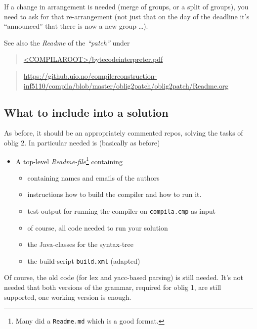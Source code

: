 \documentclass[11pt,freeform]{handout}[2014/08/13]
\begin{document}
If a change in arrangement is needed (merge of groups, or a split of
groups), you need to ask for that re-arrangement (not just that on the day
of the deadline it's ``announced'' that there is now a new group \ldots).



See also the \emph{Readme} of the \emph{``patch''} under

\begin{quote}
  \url{<COMPILAROOT>/bytecodeinterpreter.pdf}
\end{quote}

\begin{quote}
  \url{https://github.uio.no/compilerconstruction-inf5110/compila/blob/master/oblig2patch/oblig2patch/Readme.org}
\end{quote}


\subsection{What to include into a solution}
\label{sec:what-include-into}

As before, it should be an appropriately commented repos, solving the tasks
of oblig 2. In particular needed is (basically as before)


\begin{itemize}
\item A top-level \emph{Readme-file}\footnote{Many did a \texttt{Readme.md}
    which is a good format.} containing
  \begin{itemize}
  \item  containing names and emails of the authors
  \item instructions how to build the compiler and how to run it.
  \item test-output for running the compiler on \texttt{compila.cmp} as
    input
  \item of course, all code needed to run your solution 
  \item the Java-classes for the syntax-tree
  \item the build-script \texttt{build.xml} (adapted)
  \end{itemize}
\end{itemize}

Of course, the old code (for lex and yacc-based parsing) is still
needed. It's not needed that both versions of the grammar, required for
oblig 1, are still supported, one working version is enough.
\end{document}
